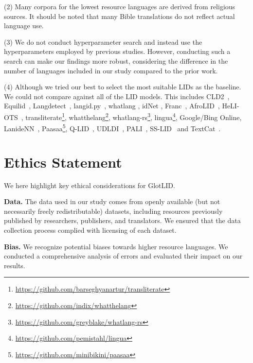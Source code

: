 \documentclass[11pt]{article}
\def\genericname{\mbox{GlotLID}\xspace}
\begin{document}
(2) Many corpora for the lowest resource languages are
derived from religious sources. It should be noted that many
Bible translations do not reflect actual language use.


(3) We do not conduct hyperparameter search and instead use the hyperparameters employed by previous studies. However, conducting such a search can make our findings more robust, considering the difference in the number of languages included in our study compared to the prior work. 


(4) Although we tried our best to select the most suitable LIDs as the baseline. We could not compare against all of the LID models. This includes CLD2~\citep{mccandless2010accuracy},
Equilid~\citep{jurgens-etal-2017-incorporating}, 
Langdetect~\citep{shuyo2010language},
langid.py~\citep{lui-baldwin-2012-langid}, whatlang \citep{brown-2014-non, la-strings}, idNet
\citep{dunn2020mapping}, Franc~\citep{franc}, AfroLID~\citep{adebara-etal-2022-afrolid}, 
HeLI-OTS~\citep{jauhiainen-etal-2022-heli},
transliterate\footnote{\url{https://github.com/barseghyanartur/transliterate}}, whatthelang\footnote{\url{https://github.com/indix/whatthelang}}, whatlang-rs\footnote{\url{https://github.com/greyblake/whatlang-rs}}, lingua\footnote{\url{https://github.com/pemistahl/lingua}}, Google/Bing Online, LanideNN~\cite{kocmi-bojar-2017-lanidenn}, Paasaa\footnote{\url{https://github.com/minibikini/paasaa}}, Q-LID~\cite{ren-etal-2022-effective}, UDLDI~\cite{goswami-etal-2020-unsupervised}, PALI~\cite{ahmadi-etal-2023-pali}, SS-LID~\citep{caswell-etal-2020-language, bapna2022building, kudugunta2023madlad}
and
TextCat~\citep{cavnar1994n}.





\section*{Ethics Statement}
We here highlight key ethical considerations for
\genericname.

\textbf{Data.}
The data used in our study comes from openly available
(but not necessarily freely redistributable)
datasets, including resources previously published by
researchers, publishers, and translators. We ensured that
the data collection process complied with licensing of each
dataset.

\textbf{Bias.} 
We recognize potential biases towards higher resource languages. We conducted a comprehensive analysis of errors and evaluated their impact on our results.
\end{document}
